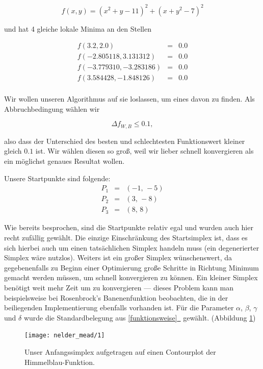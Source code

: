 \documentclass[naustrian]{article}
\newcommand*{\fullref}[1]{\hyperref[{#1}]{\autoref*{#1}~\nameref*{#1}}}
\begin{document}
{\[
    f(x,y) = (x^2 + y - 11)^2 + (x + y^2 - 7)^2
\]

und hat 4 gleiche lokale Minima an den Stellen

\begin{eqnarray*}
    f(3.2, 2.0) & = & 0.0\\
    f(-2.805118, 3.131312) & = & 0.0\\
    f(-3.779310, -3.283186) & = & 0.0\\
    f(3.584428, -1.848126) & = & 0.0\\
\end{eqnarray*}

Wir wollen unseren Algorithmus auf sie loslassen, um eines davon zu finden. Als
Abbruchbedingung wählen wir

\[
    \Delta f_{W,B} \leq 0.1,
\]

also dass der Unterschied des besten und schlechtesten Funktionswert kleiner
gleich $0.1$ ist. Wir wählen diesen so groß, weil wir lieber schnell
konvergieren als ein möglichst genaues Resultat wollen.

Unsere Startpunkte sind folgende:
\begin{eqnarray*}
    P_{1} & = & (-1,\,-5)\\
    P_{2} & = & (3,\,-8)\\
    P_{3} & = & (8,\,8)
\end{eqnarray*}

Wie bereits besprochen, sind die Startpunkte relativ egal und wurden auch hier
recht zufällig gewählt. Die einzige Einschränkung des Startsimplex ist, dass es
sich hierbei auch um einen tatsächlichen Simplex handeln muss (ein
degenerierter Simplex wäre nutzlos). Weiters ist ein großer Simplex
wünschenswert, da gegebenenfalls zu Beginn einer Optimierung große Schritte in
Richtung Minimum gemacht werden müssen, um schnell konvergieren zu können. Ein
kleiner Simplex benötigt weit mehr Zeit um zu konvergieren --- dieses Problem
kann man beispielsweise bei Rosenbrock's Banenenfunktion beobachten, die in der
beiliegenden Implementierung ebenfalls vorhanden ist. Für die Parameter
$\alpha$, $\beta$, $\gamma$ und $\delta$ wurde die Standardbelegung aus
\fullref{funktionsweise} gewählt. (Abbildung \ref{initial})

\begin{figure}[h]
    \centering
    \texttt{[image: nelder\_mead/1]}
    \caption{Unser Anfangssimplex aufgetragen auf einen Contourplot der Himmelblau-Funktion.}
    \label{initial}
\end{figure}

}
\end{document}
